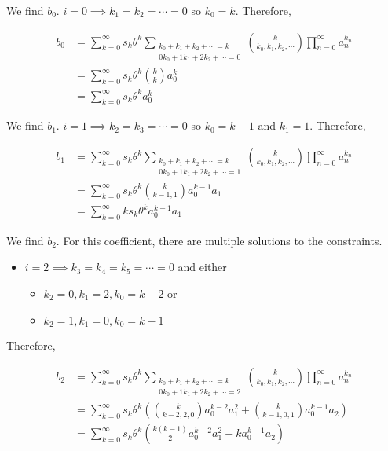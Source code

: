 We find $b_0$. $i = 0 \implies k_1 = k_2 = \cdots = 0$ so $k_0 = k$. Therefore,

\begin{align}
    b_0 
    &= \sum_{k=0}^{\infty} s_k \theta^k \sum_{\substack{k_0 + k_1 + k_2 + \cdots = k \\ 0 k_0 + 1 k_1 + 2 k_2 + \cdots = 0}} \binom{k}{k_0, k_1, k_2, \cdots} \prod_{n=0}^{\infty} a_n^{k_n} \nonumber \\
    &= \sum_{k=0}^{\infty} s_k \theta^k \binom{k}{k} a_0^{k} \nonumber \\
    &= \sum_{k=0}^{\infty} s_k \theta^k a_0^k
\end{align}

We find $b_1$. $i = 1 \implies k_2 = k_3 = \cdots = 0$ so $k_0 = k - 1$ and $k_1 = 1$. Therefore,

\begin{align}
    b_1
    &= \sum_{k=0}^{\infty} s_k \theta^k \sum_{\substack{k_0 + k_1 + k_2 + \cdots = k \\ 0 k_0 + 1 k_1 + 2 k_2 + \cdots = 1}} \binom{k}{k_0, k_1, k_2, \cdots} \prod_{n=0}^{\infty} a_n^{k_n} \nonumber \\
    &= \sum_{k=0}^{\infty} s_k \theta^k \binom{k}{k - 1, 1} a_0^{k - 1} a_1 \nonumber \\
    &= \sum_{k=0}^{\infty} k s_k \theta^k a_0^{k-1} a_1
\end{align}

We find $b_2$. For this coefficient, there are multiple solutions to the constraints. 

\begin{itemize}
    \item $i = 2 \implies k_3 = k_4 = k_5 = \cdots = 0$ and either
    \begin{itemize}
        \item $k_2 = 0, k_1 = 2, k_0 = k - 2$ or
        \item $k_2 = 1, k_1 = 0, k_0 = k - 1$
    \end{itemize}
\end{itemize}

Therefore,

\begin{align}
    b_2
    &= \sum_{k=0}^{\infty} s_k \theta^k \sum_{\substack{k_0 + k_1 + k_2 + \cdots = k \\ 0 k_0 + 1 k_1 + 2 k_2 + \cdots = 2}} \binom{k}{k_0, k_1, k_2, \cdots} \prod_{n=0}^{\infty} a_n^{k_n} \nonumber \\
    &= \sum_{k=0}^{\infty} s_k \theta^k \left(\binom{k}{k - 2, 2, 0}a_0^{k-2} a_1^{2} + \binom{k}{k - 1, 0, 1}a_0^{k-1} a_2\right) \nonumber \\
    &= \sum_{k=0}^{\infty} s_k \theta^k \left(\frac{k(k-1)}{2} a_0^{k-2}a_1^{2} + k a_0^{k-1}a_2\right)
\end{align}
